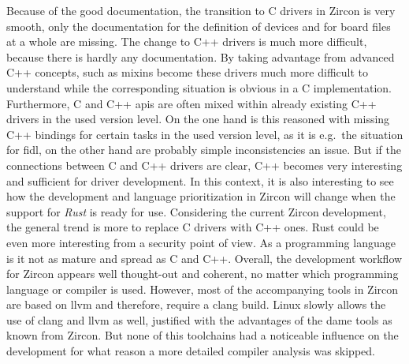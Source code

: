 Because of the good documentation, the transition to C drivers in Zircon is very smooth, only the documentation for the definition of devices and for board files at a whole are missing.
The change to C++ drivers is much more difficult, because there is hardly any documentation.
By taking advantage from advanced C++ concepts, such as mixins become these drivers much more difficult to understand while the corresponding situation is obvious in a C implementation.
Furthermore, C and C++ \acp{api} are often mixed within already existing C++ drivers in the used version level.
On the one hand is this reasoned with missing C++ bindings for certain tasks in the used version level, as it is e.g.\ the situation for \ac{fidl}, on the other hand are probably simple inconsistencies an issue.
But if the connections between C and C++ drivers are clear, C++ becomes very interesting and sufficient for driver development.
In this context, it is also interesting to see how the development and language prioritization in Zircon will change when the support for \textit{Rust} is ready for use.
Considering the current Zircon development, the general trend is more to replace C drivers with C++ ones.
Rust could be even more interesting from a security point of view.
As a programming language is it not as mature and spread as C and C++.
Overall, the development workflow for Zircon appears well thought-out and coherent, no matter which programming language or compiler is used.
However, most of the accompanying tools in Zircon are based on \ac{llvm} and therefore, require a clang build.
Linux slowly allows the use of clang and \ac{llvm} as well, justified with the advantages of the dame tools as known from Zircon.
But none of this toolchains had a noticeable influence on the development for what reason a more detailed compiler analysis was skipped.

